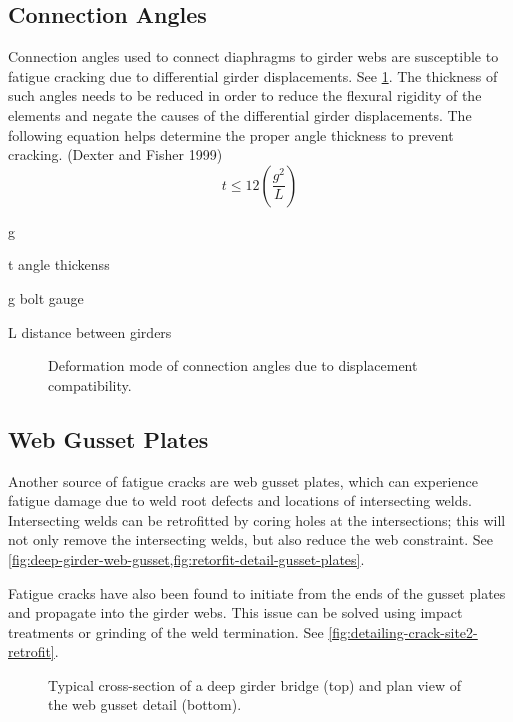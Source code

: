 \subsection{Connection Angles}
Connection angles used to connect diaphragms to girder webs are susceptible to fatigue cracking due to
differential girder displacements. See \cref{fig:deformation-mode-coneection-angles}. The thickness of such angles needs to be reduced in order to
reduce the flexural rigidity of the elements and negate the causes of the differential girder displacements. The
following equation helps determine the proper angle thickness to prevent cracking. (Dexter and Fisher 1999)
\begin{equation}
  t\leqslant 12\left(\frac{g^2}{L}\right)
\end{equation}
\begin{EqDesc}{g}
  \item[t] angle thickenss
  \item[g] bolt gauge
  \item[L] distance between girders
\end{EqDesc}

\begin{figure}
  \caption{Deformation mode of connection angles due to displacement compatibility.}
  \label{fig:deformation-mode-coneection-angles}
\end{figure}

\subsection{Web Gusset Plates}
Another source of fatigue cracks are web gusset plates, which can experience fatigue damage due to weld root
defects and locations of intersecting welds. Intersecting welds can be retrofitted by coring holes at the intersections;
this will not only remove the intersecting welds, but also reduce the web constraint. See \cref{fig:deep-girder-web-gusset,fig:retorfit-detail-gusset-plates}.

Fatigue cracks have also been found to initiate from the ends of the gusset plates and propagate into the girder
webs. This issue can be solved using impact treatments or grinding of the weld termination. See \cref{fig:detailing-crack-site2-retrofit}.

\begin{figure}
  \caption{Typical cross-section of a deep girder bridge (top) and plan view of the web gusset detail (bottom).}
  \label{fig:deep-girder-web-gusset}
\end{figure}

